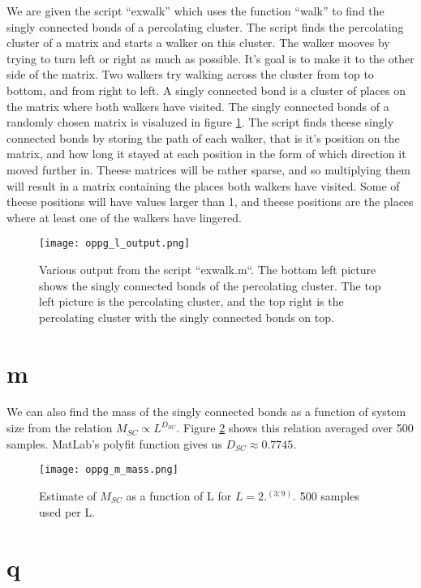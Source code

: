 \documentclass[a4paper,english, 10pt, twoside]{article}
\begin{document}
We are given the script ``exwalk'' which uses the function ``walk'' to find the singly connected bonds of a percolating 
cluster. The script finds the percolating cluster of a matrix and starts a walker on this cluster. The walker mooves by 
trying to turn left or right as much as possible. It's goal is to make it to the other side of the matrix. Two walkers 
try walking across the cluster from top to bottom, and from right to left. A singly connected bond is a cluster of places 
on the matrix where both walkers have visited. The singly connected bonds of a randomly chosen matrix is visaluzed in figure 
\ref{output_exwalk}. The script finds theese singly connected bonds by storing the path of each walker, that is it's position 
on the matrix, and how long it stayed at each position in the form of which direction it moved further in. Theese matrices 
will be rather sparse, and so multiplying them will result in a matrix containing the places both walkers have visited. 
Some of theese positions will have values larger than 1, and theese positions are the places where at least one of the 
walkers have lingered.

\begin{figure}[H]
 \centering
 \texttt{[image: oppg\_l\_output.png]}
 \caption{Various output from the script ``exwalk.m``. The bottom left picture shows the singly connected bonds of the 
 percolating cluster. The top left picture is the percolating cluster, and the top right is the percolating cluster 
 with the singly connected bonds on top.}
 \label{output_exwalk}
\end{figure}

\section*{m}

We can also find the mass of the singly connected bonds as a function of system size from the relation $M_{SC} \propto L^{D_{SC}}$. 
Figure \ref{mass_SC} shows this relation averaged over 500 samples. MatLab's polyfit function gives us $D_{SC}\approx  0.7745$.

\begin{figure}[H]
 \centering
 \texttt{[image: oppg\_m\_mass.png]}
 \caption{Estimate of $M_{SC}$ as a function of L for $L = 2.^{(3:9)}$. 500 samples used per L.}
 \label{mass_SC}
\end{figure}

\section*{q}
\end{document}
